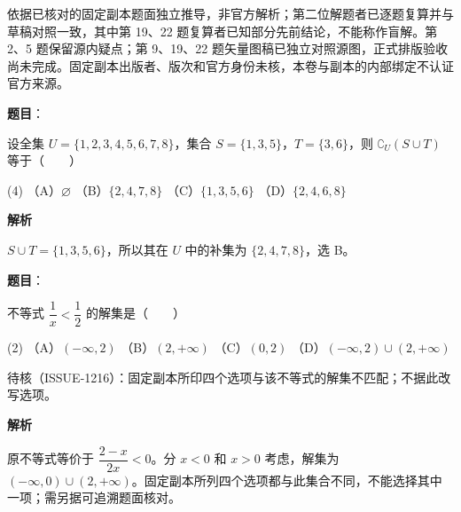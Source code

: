 

\begin{gktip}
依据已核对的固定副本题面独立推导，非官方解析；第二位解题者已逐题复算并与草稿对照一致，其中第 19、22 题复算者已知部分先前结论，不能称作盲解。第 2、5 题保留源内疑点；第 9、19、22 题矢量图稿已独立对照源图，正式排版验收尚未完成。固定副本出版者、版次和官方身份未核，本卷与副本的内部绑定不认证官方来源。
\end{gktip}

\begin{answer}

\textbf{题目}：

设全集 $U=\{1,2,3,4,5,6,7,8\}$，集合 $S=\{1,3,5\}$，$T=\{3,6\}$，则 $\complement_U(S\cup T)$ 等于\mbox{（　　）}

\begin{gkopts}(4)
\task （A）$\varnothing$
\task （B）$\{2,4,7,8\}$
\task （C）$\{1,3,5,6\}$
\task （D）$\{2,4,6,8\}$
\end{gkopts}

\textbf{解析}

$S\cup T=\{1,3,5,6\}$，所以其在 $U$ 中的补集为 $\{2,4,7,8\}$，选 B。


\end{answer}
\begin{answer}

\textbf{题目}：

不等式 $\dfrac1x<\dfrac12$ 的解集是\mbox{（　　）}

\begin{gkopts}(2)
\task （A）$(-\infty,2)$
\task （B）$(2,+\infty)$
\task （C）$(0,2)$
\task （D）$(-\infty,2)\cup(2,+\infty)$
\end{gkopts}

\begin{gktip}
待核（ISSUE-1216）：固定副本所印四个选项与该不等式的解集不匹配；不据此改写选项。
\end{gktip}

\textbf{解析}

原不等式等价于 $\dfrac{2-x}{2x}<0$。分 $x<0$ 和 $x>0$ 考虑，解集为 $(-\infty,0)\cup(2,+\infty)$。固定副本所列四个选项都与此集合不同，不能选择其中一项；需另据可追溯题面核对。


\end{answer}
